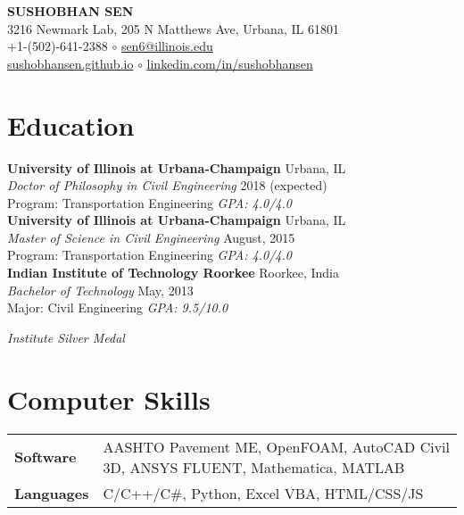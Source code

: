 \documentclass[12pt]{article}
\begin{document}
 \sloppy %
\begin{center}
{\large \uppercase{\textbf{Sushobhan Sen}}} \\
3216 Newmark Lab, 205 N Matthews Ave, Urbana, IL 61801 \\
+1-(502)-641-2388 $\circ$ \href{mailto:sen6@illinois.edu}{sen6@illinois.edu} \\
\href{http://sushobhansen.github.io/}{sushobhansen.github.io} $\circ$ \href{http://linkedin.com/in/sushobhansen}{linkedin.com/in/sushobhansen}
\end{center} 

\hfill \break %
\section*{Education}
\textbf{University of Illinois at Urbana-Champaign} \hfill Urbana, IL\\
\textit{Doctor of Philosophy in Civil Engineering} \hfill 2018 (expected)\\
Program: Transportation Engineering \hfill \textit{GPA: 4.0/4.0} \\

\textbf{University of Illinois at Urbana-Champaign} \hfill Urbana, IL\\
\textit{Master of Science in Civil Engineering} \hfill August, 2015\\
Program: Transportation Engineering \hfill \textit{GPA: 4.0/4.0} \\

\textbf{Indian Institute of Technology Roorkee} \hfill Roorkee, India\\
\textit{Bachelor of Technology} \hfill May, 2013\\
Major: Civil Engineering \hfill \textit{GPA: 9.5/10.0} \\
\strut \hfill \textit{Institute Silver Medal} \\ %

\section*{Computer Skills}
\begin{tabular}{p{10em} p{25em}} %
\textbf{Software} & AASHTO Pavement ME, OpenFOAM, AutoCAD Civil 3D, ANSYS FLUENT, Mathematica, MATLAB \\
\textbf{Languages} & C/C++/C\#, Python, Excel VBA, HTML/CSS/JS
\end{tabular}
\end{document}
